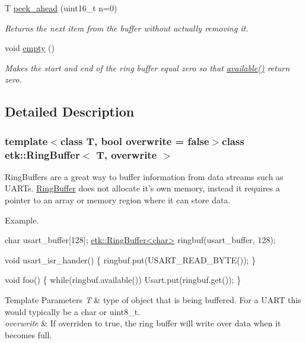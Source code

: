 \begin{DoxyCompactItemize}
T \hyperlink{classetk_1_1_ring_buffer_a64f9f9a3f4ca4448a1d7365280ae4431}{peek\-\_\-ahead} (uint16\-\_\-t n=0)
\begin{DoxyCompactList}\small\item\em Returns the next item from the buffer without actually removing it. \end{DoxyCompactList}\item 
void \hyperlink{classetk_1_1_ring_buffer_a911dbba377c34fa2d20defd1a0922171}{empty} ()
\begin{DoxyCompactList}\small\item\em Makes the start and end of the ring buffer equal zero so that \hyperlink{classetk_1_1_ring_buffer_a67b70ec4c7698adcf060810c8d7756d2}{available()} return zero. \end{DoxyCompactList}\end{DoxyCompactItemize}


\subsection{Detailed Description}
\subsubsection*{template$<$class T, bool overwrite = false$>$class etk\-::\-Ring\-Buffer$<$ T, overwrite $>$}

Ring\-Buffers are a great way to buffer information from data streams such as U\-A\-R\-Ts. \hyperlink{classetk_1_1_ring_buffer}{Ring\-Buffer} does not allocate it's own memory, instead it requires a pointer to an array or memory region where it can store data. \par
\par
 Example. 


\begin{DoxyCode}
\textcolor{keywordtype}{char} usart\_buffer[128];
\hyperlink{classetk_1_1_ring_buffer}{etk::RingBuffer<char>} ringbuf(usart\_buffer, 128);

\textcolor{keywordtype}{void} usart\_isr\_hander()
\{
    ringbuf.put(USART\_READ\_BYTE());
\}

\textcolor{keywordtype}{void} foo()
\{
    \textcolor{keywordflow}{while}(ringbuf.available())
        Usart.put(ringbuf.get());
\}
\end{DoxyCode}
 
\begin{DoxyTemplParams}{Template Parameters}
{\em T} & type of object that is being buffered. For a U\-A\-R\-T this would typically be a char or uint8\-\_\-t. \\
\hline
{\em overwrite} & If overriden to true, the ring buffer will write over data when it becomes full. \\
\hline
\end{DoxyTemplParams}


